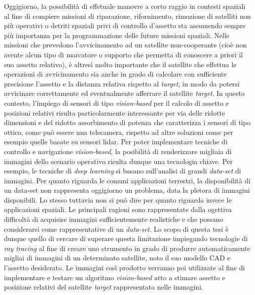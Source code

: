 Oggigiorno, la possibilità di effetuale manovre a corto raggio in contesti spaziali al fine di compiere missioni di riparazione, rifornimento, rimozione di satelliti non più operativi o detriti spaziali privi di controllo d'assetto sta assumendo sempre più importanza per la programmazione delle future missioni spaziali. Nelle missioni che prevedono l'avvicinamento ad un satellite non-cooperante (cioè non avente alcun tipo di marcatore o supporto che permetta di conoscere a priori il suo assetto relativo), è altresì molto importante che il satellite che effettua le operazioni di avvicinamento sia anche in grado di calcolare con sufficiente precisione l'assetto e la distanza relativa rispetto al \textit{target}, in modo da potersi avvicinare correttamente ed eventualmente afferrare il satellite \textit{target}. In questo contesto, l'impiego di sensori di tipo \textit{vision-based} per il calcolo di assetto e posizioni relativi risulta particolarmente interessante per via delle ridotte dimensioni e del ridotto assorbimento di potenza che caratterizza i sensori di tipo ottico, come può essere una telecamera, rispetto ad altre soluzioni come per esempio quelle basate su sensori \acrshort{lidar}. Per poter implementare tecniche di controllo e navigazione \textit{vision-based}, la posibilità di renderizzare migliaia di immagini dello scenario operativo risulta dunque una tecnologia chiave. Per esempio, le tecniche di \textit{deep learning} si basano sull'analisi di grandi \textit{data-set} di immagini.
Per quanto riguarda le comuni applicazioni terrestri, la disponibilità di un data-set non rappresenta oggigiorno un problema, data la pletora di immagini disponibili. Lo stesso tuttavia non si può dire per quanto riguarda invece le applicazioni spaziali. Le principali ragioni sono rappresentate dalla ogettiva difficoltà di acquisire immagini sufficientemente realistiche e che possano considerarsi come rappresentative di un \textit{data-set}.
Lo scopo di questa tesi è dunque quello di cercare di superare questa limitazione impiegando tecnologie di \textit{ray tracing} al fine di creare uno strumento in grado di produrre automaticamente migliai di immagini di un determinato satellite, noto il suo modello CAD e l'assetto desiderato. Le immagini così prodotto verranno poi utilizzate al fine di implementare e testare un algoritmo \textit{vision-based} atto a stimare assetto e posizione relativi del satellite \textit{target} rappresentato nelle immagini.
